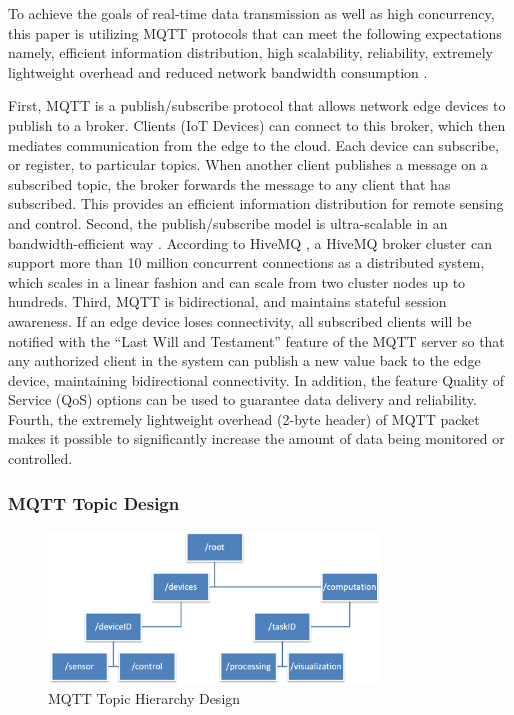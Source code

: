 \documentclass[conference]{IEEEtran}
\begin{document}
To achieve the goals of real-time data transmission as well as high concurrency, this paper is utilizing MQTT protocols that can meet the following expectations namely, efficient information distribution, high scalability, reliability, extremely lightweight overhead and reduced network bandwidth consumption \cite{b14}. 

First, MQTT is a publish/subscribe protocol that allows network edge devices to publish to a broker. Clients (IoT Devices) can connect to this broker, which then mediates communication from the edge to the cloud. Each device can subscribe, or register, to particular topics. When another client publishes a message on a subscribed topic, the broker forwards the message to any client that has subscribed. This provides an efficient information distribution for remote sensing and control. Second, the publish/subscribe model is ultra-scalable in an bandwidth-efficient way \cite{b18}. According to HiveMQ \cite{b19}, a HiveMQ broker cluster can support more than 10 million concurrent connections as a distributed system, which scales in a linear fashion and can scale from two cluster nodes up to hundreds. Third, MQTT is bidirectional, and maintains stateful session awareness. If an edge device loses connectivity, all subscribed clients will be notified with the “Last Will and Testament” feature of the MQTT server so that any authorized client in the system can publish a new value back to the edge device, maintaining bidirectional connectivity. In addition, the feature Quality of Service (QoS) options can be used to guarantee data delivery and reliability. Fourth, the extremely lightweight overhead (2-byte header) of MQTT packet makes it possible to significantly increase the amount of data being monitored or controlled.

\subsubsection{MQTT Topic Design}

\begin{figure}[htbp]
\centering
\includegraphics[width=250pt]{topic.png}
\caption{MQTT Topic Hierarchy Design}
\label{topic}
\end{figure}
\end{document}
